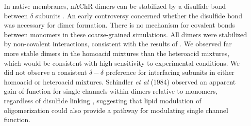 In native membranes, nAChR dimers can be stabilized by a disulfide bond between $\delta$ subunits \citep{Chang1977}.  An early controversy \citep{Anholt1980,Ruechel1981,Zingsheim1982,Schindler1984} concerned whether the disulfide bond was necessary for dimer formation. There is no mechanism for covalent bonds between monomers in these coarse-grained simulations. All dimers were stabilized by non-covalent interactions, consistent with the results of \citep{Ruechel1981,Schindler1984}. We observed far more stable dimers in the homoacid mixtures than the heteroacid mixtures, which would be consistent with high sensitivity to experimental conditions. We did not observe a consistent $\delta-\delta$ preference for interfacing subunits in either homoacid or heteroacid mixtures. Schindler {\it et al} (1984) observed an apparent gain-of-function for single-channels within dimers relative to monomers, regardless of disulfide linking \citep{Schindler1984}, suggesting that lipid modulation of oligomerization could also provide a pathway for modulating single channel function. 
